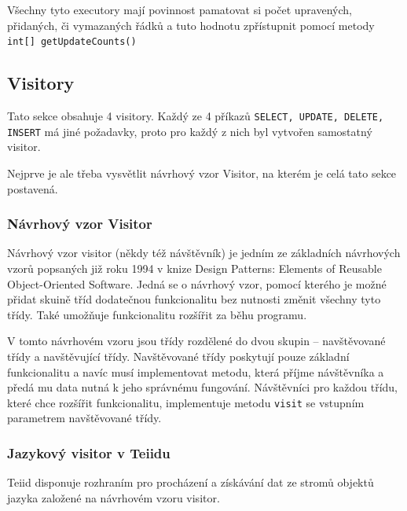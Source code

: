 \documentclass[oneside,12pt,final]{fithesis2}
\begin{document}
Všechny tyto executory mají povinnost pamatovat si počet upravených, přidaných, či vymazaných řádků a tuto hodnotu zpřístupnit pomocí metody \texttt{int[] getUpdateCounts()}
\subsection{Visitory}
Tato sekce obsahuje 4 visitory. Každý ze 4 příkazů \texttt{SELECT, UPDATE, DELETE, INSERT} má jiné požadavky, proto pro každý z nich byl vytvořen samostatný visitor.

Nejprve je ale třeba vysvětlit návrhový vzor Visitor, na kterém je celá tato sekce postavená.
\subsubsection{Návrhový vzor Visitor}

Návrhový vzor visitor (někdy též návštěvník) je jedním ze základních návrhových vzorů popsaných již roku 1994 v knize Design Patterns: Elements of Reusable Object-Oriented Software. Jedná se o návrhový vzor, pomocí kterého je možné přidat skuině tříd dodatečnou funkcionalitu bez nutnosti změnit všechny tyto třídy. Také umožňuje funkcionalitu rozšířit za běhu programu.

V tomto návrhovém vzoru jsou třídy rozdělené do dvou skupin -- navštěvované třídy a navštěvující třídy. Navštěvované třídy poskytují pouze základní funkcionalitu a navíc musí implementovat metodu, která příjme návštěvníka a předá mu data nutná k jeho správnému fungování. Návštěvníci pro každou třídu, které chce rozšířit funkcionalitu, implementuje metodu \texttt{visit} se vstupním parametrem navštěvované třídy.


\subsubsection{Jazykový visitor v Teiidu}
Teiid disponuje rozhraním pro procházení a získávání dat ze stromů objektů jazyka založené na návrhovém vzoru visitor.
\end{document}
